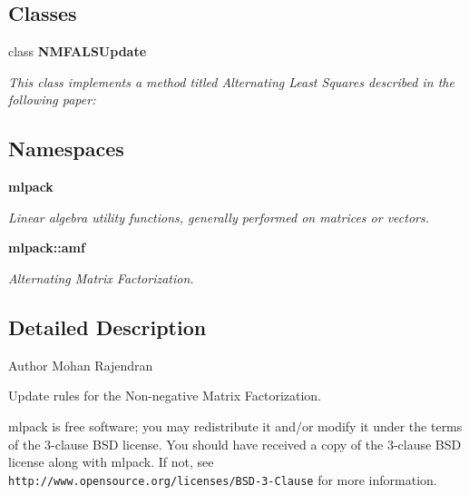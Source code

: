 \subsection*{Classes}
\begin{DoxyCompactItemize}
\item 
class \textbf{ N\+M\+F\+A\+L\+S\+Update}
\begin{DoxyCompactList}\small\item\em This class implements a method titled \textquotesingle{}Alternating Least Squares\textquotesingle{} described in the following paper\+: \end{DoxyCompactList}\end{DoxyCompactItemize}
\subsection*{Namespaces}
\begin{DoxyCompactItemize}
\item 
 \textbf{ mlpack}
\begin{DoxyCompactList}\small\item\em Linear algebra utility functions, generally performed on matrices or vectors. \end{DoxyCompactList}\item 
 \textbf{ mlpack\+::amf}
\begin{DoxyCompactList}\small\item\em Alternating Matrix Factorization. \end{DoxyCompactList}\end{DoxyCompactItemize}


\subsection{Detailed Description}
\begin{DoxyAuthor}{Author}
Mohan Rajendran
\end{DoxyAuthor}
Update rules for the Non-\/negative Matrix Factorization.

mlpack is free software; you may redistribute it and/or modify it under the terms of the 3-\/clause B\+SD license. You should have received a copy of the 3-\/clause B\+SD license along with mlpack. If not, see {\tt http\+://www.\+opensource.\+org/licenses/\+B\+S\+D-\/3-\/\+Clause} for more information. 